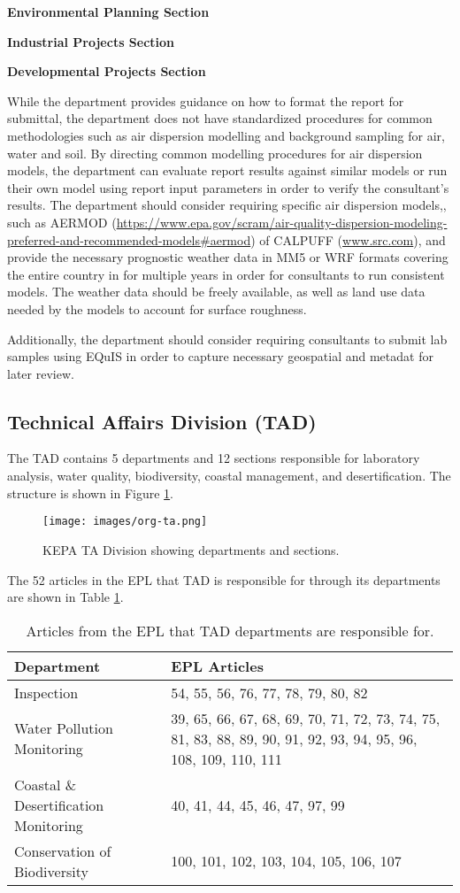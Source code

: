 \textbf{ Environmental Planning Section}

\textbf{Industrial Projects Section}

\textbf{Developmental Projects Section}

While the department provides guidance on how to format the report for submittal, the  department does not have standardized procedures for common methodologies such as air dispersion modelling and background sampling for air, water and soil. By directing common modelling procedures for air dispersion models, the department can evaluate report results against similar models or run their own model using report input parameters in order to verify the consultant's results.  The department should consider requiring specific air dispersion models,, such as AERMOD (\url{https://www.epa.gov/scram/air-quality-dispersion-modeling-preferred-and-recommended-models#aermod}) of CALPUFF (\url{www.src.com}), and provide the necessary prognostic weather data in MM5 or WRF formats \citep{Henmi2004} covering the entire country in for multiple years in order for consultants to run consistent models. The weather data should be freely available, as well as land use data  needed by the models to account for surface roughness. 

Additionally, the department should consider requiring consultants to submit lab samples using EQuIS in order to capture necessary geospatial and metadat for later review.

\subsection{Technical Affairs Division (TAD)}
The TAD contains 5 departments and 12 sections  responsible for laboratory analysis, water quality, biodiversity, coastal management, and desertification.  The structure is shown in  Figure \ref{fig:taorg}.
%
\begin{figure}[H]
\centering
\texttt{[image: images/org-ta.png]} 
\caption{KEPA TA Division showing departments and sections.}
\label{fig:taorg}
\end{figure}
%
The 52 articles in the EPL that TAD is responsible for through its departments are shown in Table \ref{tab:tadarts}.

\begin{table}[!htpb]
\centering
\caption{Articles from the EPL that TAD departments are responsible for.}
\label{tab:tadarts}
\begin{tabular}{@{}p{6cm}p{6cm}@{}}
\toprule
\textbf{Department} & \textbf{EPL Articles} \\ \midrule
Inspection & 54, 55, 56, 76, 77, 78, 79, 80, 82 \\
Water Pollution Monitoring & 39, 65, 66, 67, 68, 69, 70, 71, 72, 73, 74, 75, 81, 83, 88, 89, 90, 91, 92, 93, 94, 95, 96, 108, 109, 110, 111 \\
Coastal \& Desertification Monitoring & 40, 41, 44, 45, 46, 47, 97, 99 \\
Conservation of Biodiversity & 100, 101, 102, 103, 104, 105, 106, 107 \\ \bottomrule
\end{tabular}
\end{table}

